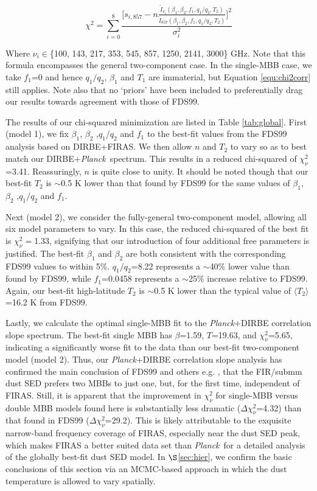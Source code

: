 \documentclass{emulateapj}
\newcommand{\PLANCK}{{\it Planck}}
\begin{document}
\begin{equation} \label{equ:chi2corr}
\chi^2 = \sum_{i=0}^{8}\frac{\big[s_{i, 857}-n\frac{\tilde{I}_{\nu_i}(\beta_1, \beta_2, f_1, q_1/q_2, T_2)}{\tilde{I}_{857}(\beta_1, \beta_2, f_1, q_1/q_2, T_2)}\big]^2}{\sigma_{i}^2}
\end{equation}

Where $\nu_i$$\in$\{100, 143, 217, 353, 545, 857, 1250, 2141, 3000\} GHz. Note 
that this formula encompasses the general two-component case. In the single-MBB
case, we take $f_1$=0 and hence $q_1/q_2$, $\beta_1$ and $T_1$ are immaterial, 
but Equation \ref{equ:chi2corr} still applies. Note also that no `priors' have
been included to preferentially drag our results towards agreement with those 
of FDS99.

The results of our chi-squared minimization are listed in Table 
\ref{tab:global}. First (model 1), we fix $\beta_1$, $\beta_2$ ,$q_1/q_2$ and
$f_1$ to the best-fit values from the FDS99 analysis based on DIRBE+FIRAS. We
then allow $n$ and $T_2$ to vary so as to best match our 
DIRBE+\PLANCK~spectrum. This results in a reduced chi-squared of 
$\chi^2_{\nu}$=3.41. Reassuringly, $n$ is quite close to unity. It should be 
noted though that our best-fit $T_2$ is $\sim$0.5 K lower than that found by 
FDS99 for the same values of $\beta_1$, $\beta_2$ ,$q_1/q_2$ and $f_1$.

Next (model 2), we consider the fully-general two-component model, allowing all
 six model parameters to vary. In this case, the reduced chi-squared of the 
best fit is $\chi^2_{\nu}=$1.33, signifying that our introduction of four 
additional free parameters is justified. The best-fit $\beta_1$ and $\beta_2$ 
are both consistent with the corresponding FDS99 values to within 5\%. 
$q_1/q_2$=8.22 represents a $\sim$40\% lower value than found by FDS99, while
$f_1$=0.0458 represents a $\sim$25\% increase relative to FDS99. Again, our
best-fit high-latitude $T_2$ is $\sim$0.5 K lower than the typical value of 
$\langle T_2 \rangle$=16.2 K from FDS99.

Lastly, we calculate the optimal single-MBB fit to the \PLANCK+DIRBE 
correlation slope spectrum. The best-fit single MBB has $\beta$=1.59, 
$T$=19.63, and $\chi^2_{\nu}$=5.65, indicating a significantly worse fit to the
data than our best-fit two-component model (model 2). Thus, our \PLANCK+DIRBE 
correlation slope analysis has confirmed the main conclusion of FDS99 and 
others e.g. \cite{reach95}, that the FIR/submm dust SED prefers two MBBs to 
just one, but, for the first time, independent of FIRAS. Still, it is apparent 
that the improvement in $\chi^2_{\nu}$ for single-MBB versus double MBB models 
found here is substantially less dramatic ($\Delta\chi^2_{\nu}$=4.32) than that
found in FDS99 ($\Delta\chi^2_{\nu}$=29.2). This is likely attributable to the 
exquisite narrow-band frequency coverage of FIRAS, especially near the dust SED
peak, which makes FIRAS a better suited data set than \PLANCK~for a detailed 
analysis of the globally best-fit dust SED model. In $\S$\ref{sec:hier}, we
confirm the basic conclusions of this section via an MCMC-based approach in
which the dust temperature is allowed to vary spatially.
\end{document}
